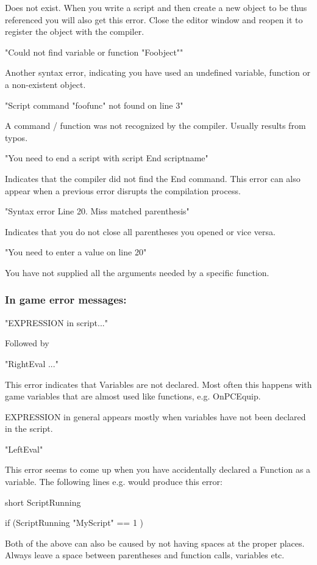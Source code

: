 \documentclass[
]{article}
\begin{document}
Does not exist. When you write a script and then create a new object to
be thus referenced you will also get this error. Close the editor window
and reopen it to register the object with the compiler.

"Could not find variable or function "Foobject""

Another syntax error, indicating you have used an undefined variable,
function or a non-existent object.

"Script command "foofunc" not found on line 3"

A command / function was not recognized by the compiler. Usually results
from typos.

"You need to end a script with script End scriptname"

Indicates that the compiler did not find the End command. This error can
also appear when a previous error disrupts the compilation process.

"Syntax error Line 20. Miss matched parenthesis"

Indicates that you do not close all parentheses you opened or vice
versa.

"You need to enter a value on line 20"

You have not supplied all the arguments needed by a specific function.

\hypertarget{in-game-error-messages}{%
\subsubsection{In game error messages:}\label{in-game-error-messages}}

"EXPRESSION in script..."

Followed by

"RightEval ..."

This error indicates that Variables are not declared. Most often this
happens with game variables that are almost used like functions, e.g.
OnPCEquip.

EXPRESSION in general appears mostly when variables have not been
declared in the script.

"LeftEval"

This error seems to come up when you have accidentally declared a
Function as a variable. The following lines e.g. would produce this
error:

short ScriptRunning

if (ScriptRunning "MyScript" == 1 )

Both of the above can also be caused by not having spaces at the proper
places. Always leave a space between parentheses and function calls,
variables etc.
\end{document}
